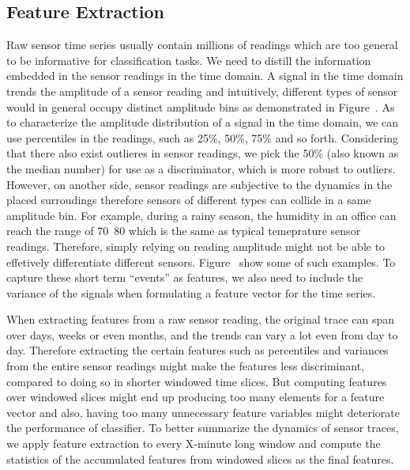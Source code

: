 \subsection{Feature Extraction}
Raw sensor time series usually contain millions of readings which are too general to be informative for classification tasks. We need to distill the information embedded in the sensor readings in the time domain. A signal in the time domain trends the amplitude of a sensor reading and intuitively, different types of sensor would in general occupy distinct amplitude bins as demonstrated in Figure~\cite{}. As to characterize the amplitude distribution of a signal in the time
domain, we can use percentiles in the readings, such as 25\%, 50\%, 75\% and so forth. Considering that there also exist outlieres in sensor readings, we pick the 50\% (also known as the median number) for use as a discriminator, which is more robust to outliers. However, on another side, sensor readings are subjective to the dynamics in the placed surroudings therefore sensors of different types can collide in a same amplitude bin. For example, during a rainy season, the humidity in an
office can reach the range of 70~80 which is the same as typical temeprature sensor readings. Therefore, simply relying on reading amplitude might not be able to effetively differentiate different sensors. Figure~\cite{} show some of such examples. To capture these short term ``events'' as features, we also need to include the variance of the signals when formulating a feature vector for the time series.

When extracting features from a raw sensor reading, the original trace can span over days, weeks or even months, and the trends can vary a lot even from day to day. Therefore extracting the certain features such as percentiles and variances from the entire sensor readings might make the features less discriminant, compared to doing so in shorter windowed time slices. But computing features over windowed slices might end up producing too many elements for a feature vector and also,
having too many unnecessary feature variables might deteriorate the performance of classifier. To better summarize the dynamics of sensor traces, we apply feature extraction to every X-minute long window and compute the statistics of the accumulated features from windowed slices as the final features. 


